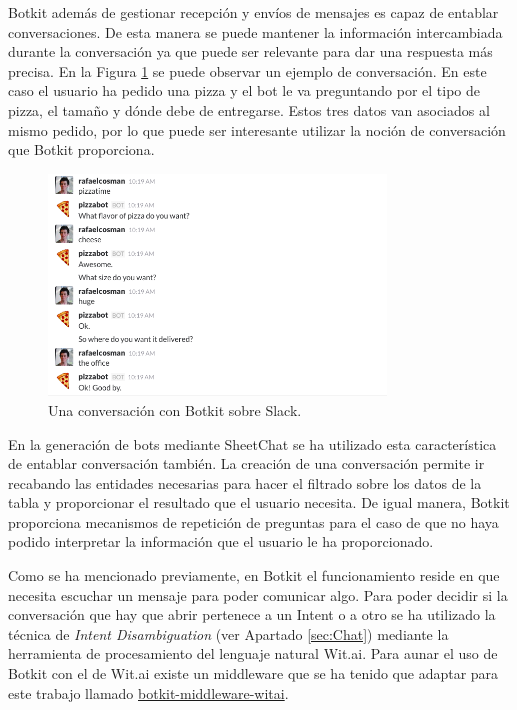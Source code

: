 Botkit además de gestionar recepción y envíos de mensajes es capaz de entablar conversaciones. De esta manera se puede mantener la información intercambiada durante la conversación ya que puede ser relevante para dar una respuesta más precisa. En la Figura \ref{fig:BotkitConversation} se puede observar un ejemplo de conversación. En este caso el usuario ha pedido una pizza y el bot le va preguntando por el tipo de pizza, el tamaño y dónde debe de entregarse. Estos tres datos van asociados al mismo pedido, por lo que puede ser interesante utilizar la noción de conversación que Botkit proporciona.

\begin{figure}[htb]
	\centering
	\includegraphics[width=0.8\textwidth]{./figs/BotkitConversation.png}
	\caption{Una conversación con Botkit sobre Slack.}
	\label{fig:BotkitConversation}
\end{figure}

En la generación de bots mediante SheetChat se ha utilizado esta característica de entablar conversación también. La creación de una conversación permite ir recabando las entidades necesarias para hacer el filtrado sobre los datos de la tabla y proporcionar el resultado que el usuario necesita. De igual manera, Botkit proporciona mecanismos de repetición de preguntas para el caso de que no haya podido interpretar la información que el usuario le ha proporcionado.

Como se ha mencionado previamente, en Botkit el funcionamiento reside en que necesita escuchar un mensaje para poder comunicar algo. Para poder decidir si la conversación que hay que abrir pertenece a un Intent o a otro se ha utilizado la técnica de \emph{Intent Disambiguation} (ver Apartado \ref{sec:Chat}) mediante la herramienta de procesamiento del lenguaje natural Wit.ai. Para aunar el uso de Botkit con el de Wit.ai existe un middleware que se ha tenido que adaptar para este trabajo llamado \href{https://github.com/haritzmedina/botkit-middleware-witai}{botkit-middleware-witai}.

